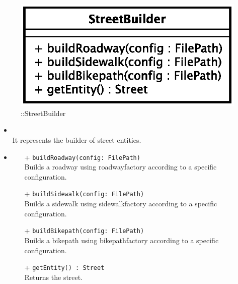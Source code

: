 \begin{figure}[h]
\centering
\includegraphics[scale=0.6,keepaspectratio]{images/solution/street_builder.eps}
\caption{\pReactiveBuild::StreetBuilder}
\label{fig:sd-app-street_builder}
\end{figure}
\FloatBarrier
\begin{itemize}
  \item \textbf{\descr} \\
    It represents the builder of street entities. 
  \item \textbf{\ops}
  \begin{itemize} 
    \item[+] \texttt{buildRoadway(config: FilePath)} \\
Builds a roadway using roadwayfactory according to a specific configuration.
    \item[+] \texttt{buildSidewalk(config: FilePath)} \\
Builds a sidewalk using sidewalkfactory according to a specific configuration.
    \item[+] \texttt{buildBikepath(config: FilePath)} \\
Builds a bikepath using bikepathfactory according to a specific configuration.
    \item[+] \texttt{getEntity() : Street} \\
Returns the street.
  \end{itemize}
\end{itemize}
